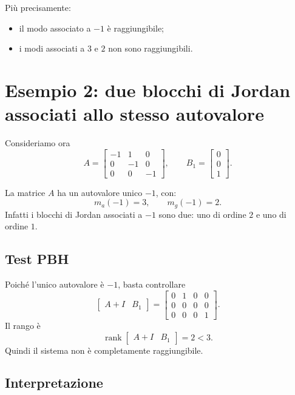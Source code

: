 Più precisamente:
\begin{itemize}
    \item il modo associato a \(-1\) è raggiungibile;
    \item i modi associati a \(3\) e \(2\) non sono raggiungibili.
\end{itemize}

\section{Esempio 2: due blocchi di Jordan associati allo stesso autovalore}

Consideriamo ora
\begin{equation}
A=
\begin{bmatrix}
-1 & 1 & 0\\
0 & -1 & 0\\
0 & 0 & -1
\end{bmatrix},
\qquad
B_1=
\begin{bmatrix}
0\\
0\\
1
\end{bmatrix}.
\label{eq:L13_es2}
\end{equation}

La matrice \(A\) ha un autovalore unico \(-1\), con:
\[
m_a(-1)=3,
\qquad
m_g(-1)=2.
\]
Infatti i blocchi di Jordan associati a \(-1\) sono due: uno di ordine \(2\) e uno di ordine \(1\).

\subsection*{Test PBH}

Poiché l’unico autovalore è \(-1\), basta controllare
\[
\begin{bmatrix}
A+I & B_1
\end{bmatrix}
=
\begin{bmatrix}
0 & 1 & 0 & 0\\
0 & 0 & 0 & 0\\
0 & 0 & 0 & 1
\end{bmatrix}.
\]
Il rango è
\[
\operatorname{rank}
\begin{bmatrix}
A+I & B_1
\end{bmatrix}
=2<3.
\]
Quindi il sistema non è completamente raggiungibile.

\subsection*{Interpretazione}

